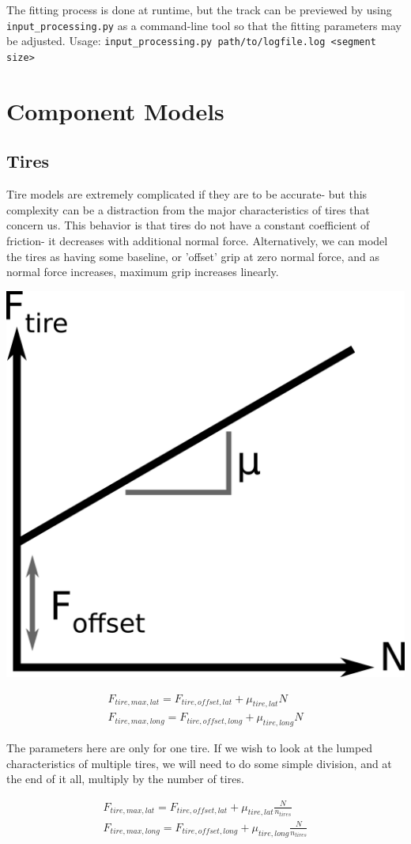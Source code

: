 \documentclass{article}
\begin{document}
The fitting process is done at runtime, but the track can be previewed by using \texttt{input\_processing.py} as a command-line tool so that the fitting parameters may be adjusted. Usage: \texttt{input\_processing.py path/to/logfile.log <segment size>}

\section{Component Models}

\subsection{Tires}

Tire models are extremely complicated if they are to be accurate- but this complexity can be a distraction from the major characteristics of tires that concern us. This behavior is that tires do not have a constant coefficient of friction- it decreases with additional normal force. Alternatively, we can model the tires as having some baseline, or 'offset' grip at zero normal force, and as normal force increases, maximum grip increases linearly.

\begin{center}
\includegraphics[height=0.3\textwidth]{tire_line.png}
\end{center}

\begin{align}
	F_{tire,max,lat} = F_{tire,offset,lat} + \mu_{tire,lat} N \\
	F_{tire,max,long} = F_{tire,offset,long} + \mu_{tire,long} N
\end{align}

The parameters here are only for one tire. If we wish to look at the lumped characteristics of multiple tires, we will need to do some simple division, and at the end of it all, multiply by the number of tires.

\begin{align}
	F_{tire,max,lat} = F_{tire,offset,lat} + \mu_{tire,lat} \frac{N}{n_{tires}} \\
	F_{tire,max,long} = F_{tire,offset,long} + \mu_{tire,long} \frac{N}{n_{tires}}
\end{align}
\end{document}
